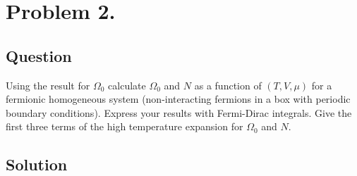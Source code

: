 \section*{Problem 2.}
\subsection*{Question}
Using the result for $\Omega_{0}$ calculate $\Omega_{0}$ and $N$ as a function of $(T, V, \mu)$ for a fermionic homogeneous system (non-interacting fermions in a box with periodic boundary conditions). Express your results with Fermi-Dirac integrals. Give the first three terms of the high temperature expansion for $\Omega_{0}$ and $N$.

\subsection*{Solution}
